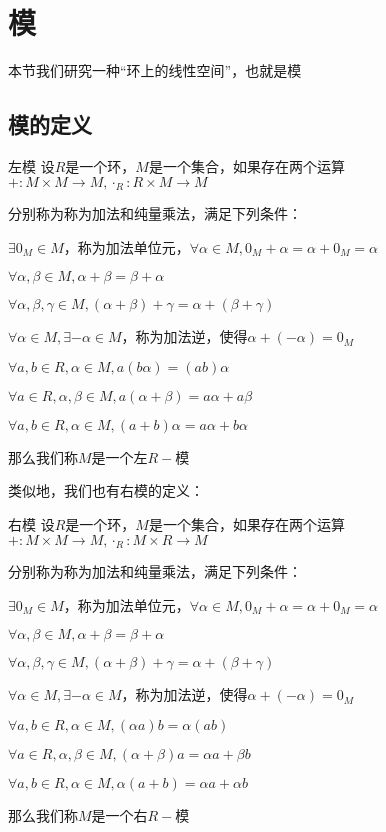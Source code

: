 \documentclass[12pt, a4paper, oneside, UTF8]{ctexbook}
\begin{document}
	\section{模}
		本节我们研究一种“环上的线性空间”，也就是模
		\subsection{模的定义}
			\begin{defn}{左模}{}
				设$R$是一个环，$M$是一个集合，如果存在两个运算$+ : M \times M \rightarrow M,\cdot_R : R \times M \rightarrow M$
				
				分别称为称为加法和纯量乘法，满足下列条件：

				 $\exists 0_M \in M$，称为加法单位元，$\forall \alpha \in M,0_M + \alpha =\alpha +0_M=\alpha $

				 $\forall \alpha,\beta  \in M,\alpha +\beta =\beta +\alpha $

				 $\forall \alpha,\beta,\gamma  \in M,(\alpha +\beta )+\gamma =\alpha +(\beta +\gamma )$

				 $\forall \alpha \in M,\exists -\alpha \in M$，称为加法逆，使得$\alpha +(-\alpha )=0_M$

				 $\forall a,b \in R,\alpha \in M,a(b\alpha )=(ab)\alpha$

				 $\forall a \in R,\alpha ,\beta \in M,a(\alpha +\beta )=a\alpha +a\beta $

				 $\forall a,b \in R,\alpha \in M,(a+b)\alpha =a\alpha +b\alpha $

				那么我们称$M$是一个左$R-$模
			\end{defn}
			类似地，我们也有右模的定义：
			\begin{defn}{右模}{}
				设$R$是一个环，$M$是一个集合，如果存在两个运算$+ : M \times M \rightarrow M,\cdot_R : M \times R \rightarrow M$
				
				分别称为称为加法和纯量乘法，满足下列条件：

				 $\exists 0_M \in M$，称为加法单位元，$\forall \alpha \in M,0_M + \alpha =\alpha +0_M=\alpha $

				 $\forall \alpha,\beta  \in M,\alpha +\beta =\beta +\alpha $

				 $\forall \alpha,\beta,\gamma  \in M,(\alpha +\beta )+\gamma =\alpha +(\beta +\gamma )$

				 $\forall \alpha \in M,\exists -\alpha \in M$，称为加法逆，使得$\alpha +(-\alpha )=0_M$

				 $\forall a,b \in R,\alpha \in M,(\alpha a)b=\alpha (ab)$

				 $\forall a \in R,\alpha ,\beta \in M,(\alpha +\beta )a=\alpha a+\beta b$

				 $\forall a,b \in R,\alpha \in M,\alpha (a+b)=\alpha a+\alpha b$

				那么我们称$M$是一个右$R-$模
			\end{defn}
\end{document}
